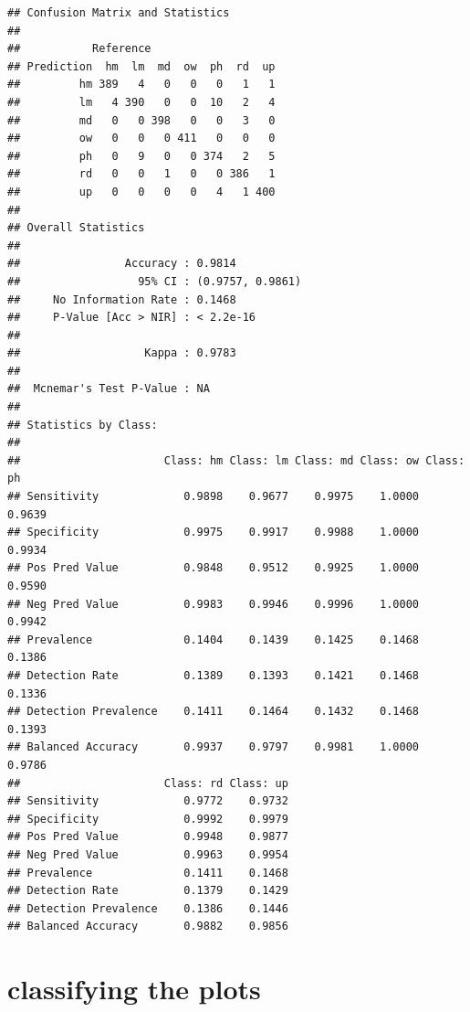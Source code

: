 \documentclass[
]{article}
\newenvironment{Shaded}{\begin{snugshade}}{\end{snugshade}}
\newcommand{\CommentTok}[1]{\textcolor[rgb]{0.56,0.35,0.01}{\textit{#1}}}
\newcommand{\FunctionTok}[1]{\textcolor[rgb]{0.13,0.29,0.53}{\textbf{#1}}}
\newcommand{\NormalTok}[1]{#1}
\newcommand{\SpecialCharTok}[1]{\textcolor[rgb]{0.81,0.36,0.00}{\textbf{#1}}}
\begin{document}
\begin{Shaded}
\end{Shaded}

\begin{verbatim}
## Confusion Matrix and Statistics
## 
##           Reference
## Prediction  hm  lm  md  ow  ph  rd  up
##         hm 389   4   0   0   0   1   1
##         lm   4 390   0   0  10   2   4
##         md   0   0 398   0   0   3   0
##         ow   0   0   0 411   0   0   0
##         ph   0   9   0   0 374   2   5
##         rd   0   0   1   0   0 386   1
##         up   0   0   0   0   4   1 400
## 
## Overall Statistics
##                                           
##                Accuracy : 0.9814          
##                  95% CI : (0.9757, 0.9861)
##     No Information Rate : 0.1468          
##     P-Value [Acc > NIR] : < 2.2e-16       
##                                           
##                   Kappa : 0.9783          
##                                           
##  Mcnemar's Test P-Value : NA              
## 
## Statistics by Class:
## 
##                      Class: hm Class: lm Class: md Class: ow Class: ph
## Sensitivity             0.9898    0.9677    0.9975    1.0000    0.9639
## Specificity             0.9975    0.9917    0.9988    1.0000    0.9934
## Pos Pred Value          0.9848    0.9512    0.9925    1.0000    0.9590
## Neg Pred Value          0.9983    0.9946    0.9996    1.0000    0.9942
## Prevalence              0.1404    0.1439    0.1425    0.1468    0.1386
## Detection Rate          0.1389    0.1393    0.1421    0.1468    0.1336
## Detection Prevalence    0.1411    0.1464    0.1432    0.1468    0.1393
## Balanced Accuracy       0.9937    0.9797    0.9981    1.0000    0.9786
##                      Class: rd Class: up
## Sensitivity             0.9772    0.9732
## Specificity             0.9992    0.9979
## Pos Pred Value          0.9948    0.9877
## Neg Pred Value          0.9963    0.9954
## Prevalence              0.1411    0.1468
## Detection Rate          0.1379    0.1429
## Detection Prevalence    0.1386    0.1446
## Balanced Accuracy       0.9882    0.9856
\end{verbatim}

\section{classifying the plots}\label{classifying-the-plots-1}
\end{document}
